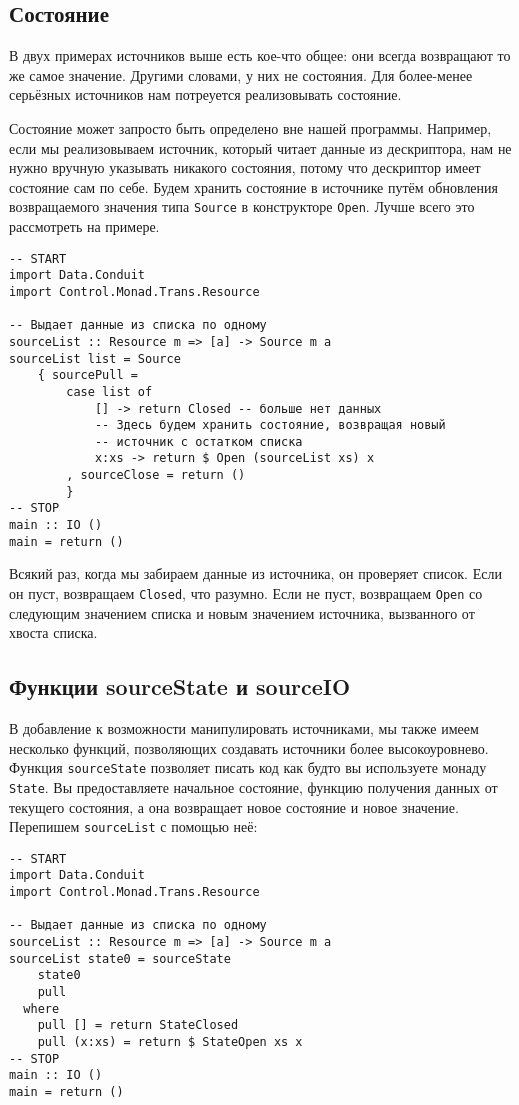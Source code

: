\subsection{Состояние}
В двух примерах источников выше есть кое-что общее: они всегда возвращают то же самое
значение. Другими словами, у них не состояния. Для более-менее серьёзных источников нам
потреуется реализовывать состояние.

Состояние может запросто быть определено вне нашей программы. Например, если мы
реализовываем источник, который читает данные из дескриптора, нам не нужно вручную
указывать никакого состояния, потому что дескриптор имеет состояние сам по себе.
Будем хранить состояние в источнике путём обновления возвращаемого значения типа
\lstinline=Source= в конструкторе \lstinline=Open=. Лучше всего это рассмотреть на
примере.

\begin{lstlisting}
-- START
import Data.Conduit
import Control.Monad.Trans.Resource

-- Выдает данные из списка по одному
sourceList :: Resource m => [a] -> Source m a
sourceList list = Source
    { sourcePull =
        case list of
            [] -> return Closed -- больше нет данных
            -- Здесь будем хранить состояние, возвращая новый 
            -- источник с остатком списка
            x:xs -> return $ Open (sourceList xs) x
        , sourceClose = return ()
        }
-- STOP
main :: IO ()
main = return ()
\end{lstlisting}

Всякий раз, когда мы забираем данные из источника, он проверяет список. Если он пуст,
возвращаем \lstinline=Closed=, что разумно. Если не пуст, возвращаем \lstinline=Open= со
следующим значением
списка и новым значением источника, вызванного от хвоста списка.

\subsection{Функции sourceState и sourceIO}
В добавление к возможности манипулировать источниками, мы также имеем несколько функций,
позволяющих создавать источники более высокоуровнево. Функция \lstinline=sourceState=
позволяет писать
код как будто вы используете монаду \lstinline=State=. Вы предоставляете начальное
состояние,
функцию получения данных от текущего состояния, а она возвращает новое состояние и
новое значение. Перепишем \lstinline=sourceList= с помощью неё:

\begin{lstlisting}
-- START
import Data.Conduit
import Control.Monad.Trans.Resource

-- Выдает данные из списка по одному
sourceList :: Resource m => [a] -> Source m a
sourceList state0 = sourceState
    state0
    pull
  where
    pull [] = return StateClosed
    pull (x:xs) = return $ StateOpen xs x
-- STOP
main :: IO ()
main = return ()
\end{lstlisting}

